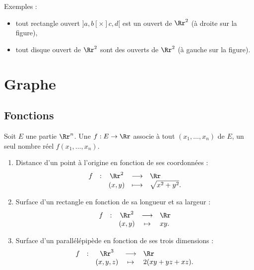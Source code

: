 \documentclass[12pt, class=report,crop=false]{standalone}
\begin{document}
Exemples : 
\begin{itemize}
  \item tout rectangle ouvert $]a,b[\times ]c,d[$ est un ouvert de $\Rr^2$ (à droite sur la figure),
  \item tout disque ouvert  de $\Rr^2$ sont des ouverts de $\Rr^2$ (à gauche sur la figure).
\end{itemize}



\section{Graphe}

\subsection{Fonctions }

\begin{definition}
Soit $E$ une partie $\Rr^n$. 
Une  $f : E \to \Rr$ associe à tout 
$(x_1,\ldots,x_n)$ de $E$, un seul nombre réel $f(x_1,\ldots,x_n)$.
\end{definition}

\begin{exemple}
\sauteligne
\begin{enumerate}
\item Distance d'un point à l'origine en fonction de ses coordonnées :
$$\begin{array}{ccccl}f&:&\Rr^2&\longrightarrow &\Rr\\ &&(x,y)&\longmapsto &\sqrt{x^2+y^2}.\end{array}$$
\item Surface d'un rectangle en fonction de sa longueur et sa largeur :
$$\begin{array}{ccccl}f&:&\Rr^2&\longrightarrow &\Rr\\ &&(x,y)&\mapsto &xy.\end{array}$$
\item Surface d'un parallélépipède en fonction de ses trois dimensions :
$$\begin{array}{ccccl}f&:&\Rr^3&\longrightarrow &\Rr\\ &&(x,y,z)&\mapsto &2(xy+yz+xz).\end{array}$$
\end{enumerate}
\end{exemple}
\end{document}
